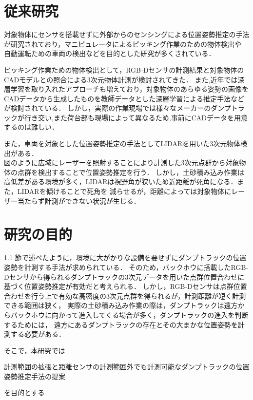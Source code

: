 \newpage

\section{従来研究}
対象物体にセンサを搭載せずに外部からのセンシングによる位置姿勢推定の手法が研究されており，マニピュレータによるピッキング作業のための物体検出や
自動運転ための車両の検出などを目的とした研究が多くされている．

ピッキング作業ための物体検出として，RGB-Dセンサの計測結果と対象物体のCADモデルとの照合による3次元物体計測が検討されてきた．\cite{中原智治2001}\cite{林2008}\cite{西卓郎2014}
また,近年では深層学習を取り入れたアプローチも増えており，対象物体のあらゆる姿勢の画像をCADデータから生成したものを教師データとした深層学習による推定手法\cite{Sundermeyer2018}\cite{Tremblay2018}などが検討されている．
しかし，実際の作業現場では様々なメーカーのダンプトラックが行き交い,また荷台部も現場によって異なるため,事前にCADデータを用意するのは難しい．

また，車両を対象とした位置姿勢推定の手法としてLIDARを用いた3次元物体検出がある．\cite{Zhang2017}\cite{Chen2017}\cite{Lang2019}\\
図のように広域にレーザーを照射することにより計測した3次元点群から対象物体の点群を検出することで位置姿勢推定を行う．
しかし，土砂積み込み作業は高低差がある環境が多く，LIDARは視野角が狭いため近距離が死角になる．また，LIDARを傾けることで死角を
減らせるが，距離によっては対象物体にレーザー当たらず計測ができない状況が生じる．

\newpage

\section{研究の目的}
1.1 節で述べたように，環境に大がかりな設備を要せずにダンプトラックの位置姿勢を計測する手法が求められている．
そのため，バックホウに搭載したRGB-Dセンサから得られるダンプトラックの3次元データを用いた点群位置合わせに基づく位置姿勢推定が有効だと考えられる．
しかし，RGB-Dセンサは点群位置合わせを行う上で有効な高密度の3次元点群を得られるが，計測距離が短く計測できる範囲は狭く，
実際の土砂積み込み作業の際は，ダンプトラックは遠方からバックホウに向かって進入してくる場合が多く，ダンプトラックの進入を判断するためには，
遠方にあるダンプトラックの存在とその大まかな位置姿勢を計測する必要がある．



\par
そこで，本研究では
    \begin{screen}
        \begin{center}
        計測範囲の拡張と距離センサの計測範囲外でも計測可能なダンプトラックの位置姿勢推定手法の提案
        \end{center}
    \end{screen}
を目的とする
\newpage
